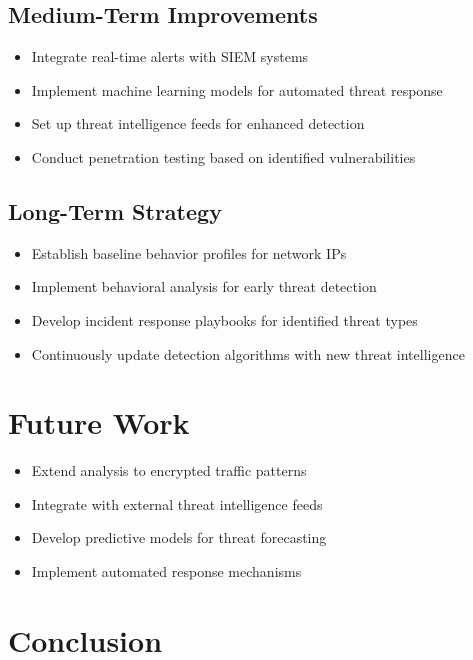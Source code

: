 \documentclass[12pt,a4paper]{report}
\begin{document}
\subsection{Medium-Term Improvements}

\begin{itemize}
    \item Integrate real-time alerts with SIEM systems
    \item Implement machine learning models for automated threat response
    \item Set up threat intelligence feeds for enhanced detection
    \item Conduct penetration testing based on identified vulnerabilities
\end{itemize}

\subsection{Long-Term Strategy}

\begin{itemize}
    \item Establish baseline behavior profiles for network IPs
    \item Implement behavioral analysis for early threat detection
    \item Develop incident response playbooks for identified threat types
    \item Continuously update detection algorithms with new threat intelligence
\end{itemize}

\section{Future Work}

\begin{itemize}
    \item Extend analysis to encrypted traffic patterns
    \item Integrate with external threat intelligence feeds
    \item Develop predictive models for threat forecasting
    \item Implement automated response mechanisms
\end{itemize}

\section{Conclusion}
\end{document}
